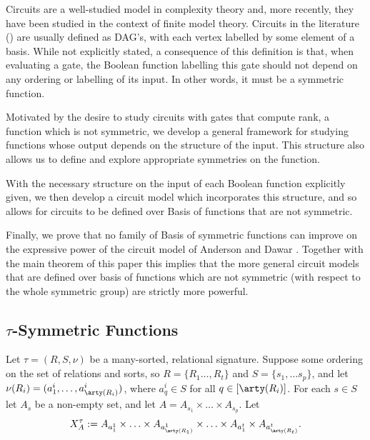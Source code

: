 \documentclass[../paper.tex]{subfiles}
\begin{document}
Circuits are a well-studied model in complexity theory and, more recently, they
have been studied in the context of finite model theory. Circuits in the
literature () are usually defined as DAG's, with each vertex labelled by some
element of a basis. While not explicitly stated, a consequence of this
definition is that, when evaluating a gate, the Boolean function labelling this
gate should not depend on any ordering or labelling of its input. In other
words, it must be a symmetric function.

Motivated by the desire to study circuits with gates that compute rank, a
function which is not symmetric, we develop a general framework for studying
functions whose output depends on the structure of the input. This structure
also allows us to define and explore appropriate symmetries on the function.

With the necessary structure on the input of each Boolean function explicitly given, we then
develop a circuit model which incorporates this structure, and so allows for
circuits to be defined over Basis of functions that are not symmetric.

Finally, we prove that no family of Basis of symmetric functions can improve on
the expressive power of the circuit model of Anderson and Dawar \cite{AndersonD17}.
Together with the main theorem of this paper this implies that the more general
circuit models that are defined over basis of functions which are not symmetric
(with respect to the whole symmetric group) are strictly more powerful.





\subsection{$\tau$-Symmetric Functions}
Let $\tau = (R, S, \nu)$ be a many-sorted, relational signature. Suppose some
ordering on the set of relations and sorts, so $R = \{R_1 \ldots, R_t\}$ and $S
= \{s_1, \ldots s_p\}$, and let $\nu(R_i) = (a^i_1, \ldots , a^i_{\arty(R_i)})$,
where $a^i_q \in S$ for all $q \in [\arty(R_i)]$. For each $s \in S$ let $A_{s}$
be a non-empty set, and let $A = A_{s_1} \times \ldots \times A_{s_p}$. Let
\[
  X^{\tau}_A:= A_{a^1_1} \times \ldots \times A_{a^1_{\arty(R_1)}} \times \ldots
  \times A_{a^t_1} \times A_{a^t_{\arty(R_t)}}.
\]
\end{document}
